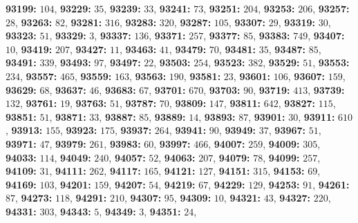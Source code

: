 \textsf{\bfseries 93199:} $104$, \textsf{\bfseries 93229:} $35$, \textsf{\bfseries 93239:} $33$, \textsf{\bfseries 93241:} $73$, \textsf{\bfseries 93251:} $204$, \textsf{\bfseries 93253:} $206$, \textsf{\bfseries 93257:} $28$, \textsf{\bfseries 93263:} $82$, \textsf{\bfseries 93281:} $316$, \textsf{\bfseries 93283:} $320$, \textsf{\bfseries 93287:} $105$, \textsf{\bfseries 93307:} $29$, \textsf{\bfseries 93319:} $30$, \textsf{\bfseries 93323:} $51$, \textsf{\bfseries 93329:} $3$, \textsf{\bfseries 93337:} $136$, \textsf{\bfseries 93371:} $257$, \textsf{\bfseries 93377:} $85$, \textsf{\bfseries 93383:} $749$, \textsf{\bfseries 93407:} $10$, \textsf{\bfseries 93419:} $207$, \textsf{\bfseries 93427:} $11$, \textsf{\bfseries 93463:} $41$, \textsf{\bfseries 93479:} $70$, \textsf{\bfseries 93481:} $35$, \textsf{\bfseries 93487:} $85$, \textsf{\bfseries 93491:} $339$, \textsf{\bfseries 93493:} $97$, \textsf{\bfseries 93497:} $22$, \textsf{\bfseries 93503:} $254$, \textsf{\bfseries 93523:} $382$, \textsf{\bfseries 93529:} $51$, \textsf{\bfseries 93553:} $234$, \textsf{\bfseries 93557:} $465$, \textsf{\bfseries 93559:} $163$, \textsf{\bfseries 93563:} $190$, \textsf{\bfseries 93581:} $23$, \textsf{\bfseries 93601:} $106$, \textsf{\bfseries 93607:} $159$, \textsf{\bfseries 93629:} $68$, \textsf{\bfseries 93637:} $46$, \textsf{\bfseries 93683:} $67$, \textsf{\bfseries 93701:} $670$, \textsf{\bfseries 93703:} $90$, \textsf{\bfseries 93719:} $413$, \textsf{\bfseries 93739:} $132$, \textsf{\bfseries 93761:} $19$, \textsf{\bfseries 93763:} $51$, \textsf{\bfseries 93787:} $70$, \textsf{\bfseries 93809:} $147$, \textsf{\bfseries 93811:} $642$, \textsf{\bfseries 93827:} $115$, \textsf{\bfseries 93851:} $51$, \textsf{\bfseries 93871:} $33$, \textsf{\bfseries 93887:} $85$, \textsf{\bfseries 93889:} $14$, \textsf{\bfseries 93893:} $87$, \textsf{\bfseries 93901:} $30$, \textsf{\bfseries 93911:} $610$, \textsf{\bfseries 93913:} $155$, \textsf{\bfseries 93923:} $175$, \textsf{\bfseries 93937:} $264$, \textsf{\bfseries 93941:} $90$, \textsf{\bfseries 93949:} $37$, \textsf{\bfseries 93967:} $51$, \textsf{\bfseries 93971:} $47$, \textsf{\bfseries 93979:} $261$, \textsf{\bfseries 93983:} $60$, \textsf{\bfseries 93997:} $466$, \textsf{\bfseries 94007:} $259$, \textsf{\bfseries 94009:} $305$, \textsf{\bfseries 94033:} $114$, \textsf{\bfseries 94049:} $240$, \textsf{\bfseries 94057:} $52$, \textsf{\bfseries 94063:} $207$, \textsf{\bfseries 94079:} $78$, \textsf{\bfseries 94099:} $257$, \textsf{\bfseries 94109:} $31$, \textsf{\bfseries 94111:} $262$, \textsf{\bfseries 94117:} $165$, \textsf{\bfseries 94121:} $127$, \textsf{\bfseries 94151:} $315$, \textsf{\bfseries 94153:} $69$, \textsf{\bfseries 94169:} $103$, \textsf{\bfseries 94201:} $159$, \textsf{\bfseries 94207:} $54$, \textsf{\bfseries 94219:} $67$, \textsf{\bfseries 94229:} $129$, \textsf{\bfseries 94253:} $91$, \textsf{\bfseries 94261:} $87$, \textsf{\bfseries 94273:} $118$, \textsf{\bfseries 94291:} $210$, \textsf{\bfseries 94307:} $95$, \textsf{\bfseries 94309:} $10$, \textsf{\bfseries 94321:} $43$, \textsf{\bfseries 94327:} $220$, \textsf{\bfseries 94331:} $303$, \textsf{\bfseries 94343:} $5$, \textsf{\bfseries 94349:} $3$, \textsf{\bfseries 94351:} $24$, 
